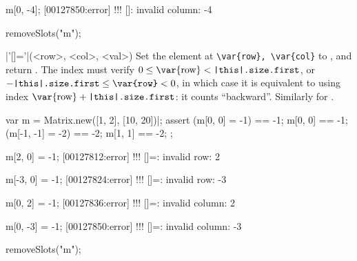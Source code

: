 \begin{urbiscriptapi}
\begin{urbiscript}
m[0, -4];
[00127850:error] !!! []: invalid column: -4
\end{urbiscript}
\begin{urbicomment}
  removeSlots("m");
\end{urbicomment}


\item|'[]='|(<row>, <col>, <val>)%
  Set the element at \lstinline|\var{row}, \var{col}| to , and
  return .  The index  must verify $0 \le
  \textrm{\var{row}} < \texttt{\this.size.first}$, or
  $-\texttt{\this.size.first} \le \texttt{\var{row}} < 0$, in which case it
  is equivalent to using index $\textrm{\var{row}} +
  \texttt{\this.size.first}$: it counts ``backward''.  Similarly for
  .
\begin{urbiscript}
var m = Matrix.new([1, 2], [10, 20])|;
assert
{
  (m[0, 0]  = -1) == -1;   m[0, 0] == -1;
  (m[-1, -1] = -2) == -2;  m[1, 1] == -2;
};

m[2, 0] = -1;
[00127812:error] !!! []=: invalid row: 2

m[-3, 0] = -1;
[00127824:error] !!! []=: invalid row: -3

m[0, 2] = -1;
[00127836:error] !!! []=: invalid column: 2

m[0, -3] = -1;
[00127850:error] !!! []=: invalid column: -3
\end{urbiscript}
\begin{urbicomment}
  removeSlots("m");
\end{urbicomment}

\end{urbiscriptapi}

